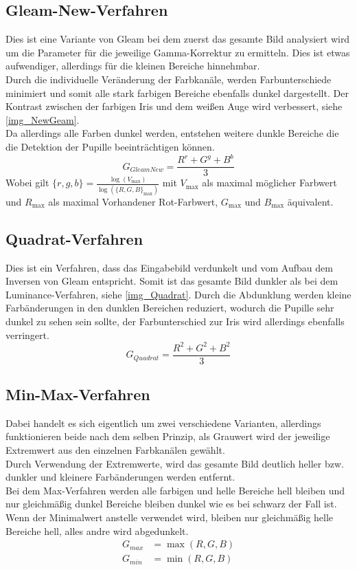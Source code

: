 \subsection{Gleam-New-Verfahren}
\label{gray_New}
Dies ist eine Variante von Gleam bei dem zuerst das gesamte Bild analysiert wird um die Parameter für die jeweilige Gamma-Korrektur zu ermitteln. Dies ist etwas aufwendiger, allerdings für die kleinen Bereiche hinnehmbar.\\
Durch die individuelle Veränderung der Farbkanäle, werden Farbunterschiede minimiert und somit alle stark farbigen Bereiche ebenfalls dunkel dargestellt. Der Kontrast zwischen der farbigen Iris und dem weißen Auge wird verbessert, siehe \autoref{img_NewGeam}.\\
Da allerdings alle Farben dunkel werden, entstehen weitere dunkle Bereiche die die Detektion der Pupille beeinträchtigen können.
\[G_{Gleam New}=\dfrac{R^{r} + G^{g} + B^{b}}{3}\]
Wobei gilt $\{r,g,b\} = \frac{\log(V_{\max})}{\log(\{R,G,B\}_{\max})}$ mit $V_{\max}$ als maximal möglicher Farbwert und $R_{\max}$ als maximal Vorhandener Rot-Farbwert, $G_{\max}$ und $B_{\max}$ äquivalent.
\subsection{Quadrat-Verfahren}
\label{gray_Quadrat}
Dies ist ein Verfahren, dass das Eingabebild verdunkelt und vom Aufbau dem Inversen von Gleam entspricht. Somit ist das gesamte Bild dunkler als bei dem Luminance-Verfahren, siehe \autoref{img_Quadrat}.
Durch die Abdunklung werden kleine Farbänderungen in den dunklen Bereichen reduziert, wodurch die Pupille sehr dunkel zu sehen sein sollte, der Farbunterschied zur Iris wird allerdings ebenfalls verringert.
\[G_{Quadrat}=\dfrac{R^2+G^2+B^2}{3}\]
\subsection{Min-Max-Verfahren}
\label{gray_MinMax}
Dabei handelt es sich eigentlich um zwei verschiedene Varianten, allerdings funktionieren beide nach dem selben Prinzip, als Grauwert wird der jeweilige Extremwert aus den einzelnen Farbkanälen gewählt.\\
Durch Verwendung der Extremwerte, wird das gesamte Bild deutlich heller bzw. dunkler und kleinere Farbänderungen werden entfernt.\\
Bei dem Max-Verfahren werden alle farbigen und helle Bereiche hell bleiben und nur gleichmäßig dunkel Bereiche bleiben dunkel wie es bei schwarz der Fall ist. Wenn der Minimalwert anstelle verwendet wird, bleiben nur gleichmäßig helle Bereiche hell, alles andre wird abgedunkelt.
\begin{align*}
G_{max} &= \max(R,G,B)\\
G_{min} &= \min(R,G,B)
\end{align*}
